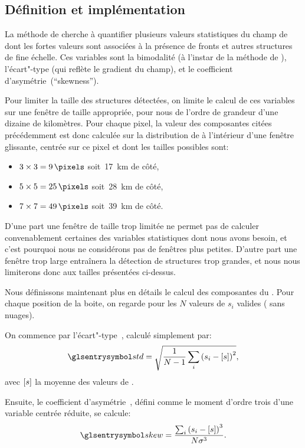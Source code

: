 \subsection{Définition et implémentation}
\label{sec:HI-definition}

La méthode de \textcite{liu_2016} cherche à quantifier plusieurs valeurs statistiques du champ de  dont les fortes valeurs sont associées à la présence de fronts et autres structures de fine échelle.
Ces variables sont la bimodalité (à l'instar de la méthode de \textcite{cayula_1992}), l'écart"-type (qui reflète le gradient du champ), et le coefficient d'asymétrie~(\enquote{skewness}).

Pour limiter la taille des structures détectées, on limite le calcul de ces variables sur une fenêtre de taille appropriée,  pour nous de l'ordre de grandeur d'une dizaine de kilomètres.
Pour chaque pixel, la valeur des composantes citées précédemment est donc calculée sur la distribution de  à l'intérieur d'une fenêtre glissante, centrée sur ce pixel et dont les tailles possibles sont:
\begin{itemize}
        \item \(3 \times 3 = \qty{9}{\pixels}\) soit~\qty{17}{\km} de côté,
        \item \(5 \times 5 = \qty{25}{\pixels}\) soit~\qty{28}{\km} de côté,
        \item \(7 \times 7 = \qty{49}{\pixels}\) soit~\qty{39}{\km} de côté.
\end{itemize}
D'une part une fenêtre de taille trop limitée ne permet pas de calculer convenablement certaines des variables statistiques dont nous avons besoin, et c'est pourquoi nous ne considérons pas de fenêtres plus petites.
D'autre part une fenêtre trop large entraînera la détection de structures trop grandes, et nous nous limiterons donc aux tailles présentées ci-dessus.

Nous définissons maintenant plus en détails le calcul des composantes du .
Pour chaque position de la boite, on regarde pour les \(N\) valeurs de  \(s_{i}\) valides ( sans nuages).

On commence par l'écart"-type~, calculé simplement par:
\begin{equation}
  \am{std} = \sqrt{\frac{1}{N-1} \sum_i \paren{s_i - \moy{s}}^2},
\end{equation}
avec \(\left[s\right]\) la moyenne des valeurs de .

Ensuite, le coefficient d'asymétrie~, défini comme le moment d'ordre trois d'une variable centrée réduite, se calcule:
\begin{equation}
  \am{skew} = \frac{\sum_i \paren{s_i - \moy{s}}^3} {N \sigma^3}.
\end{equation}


